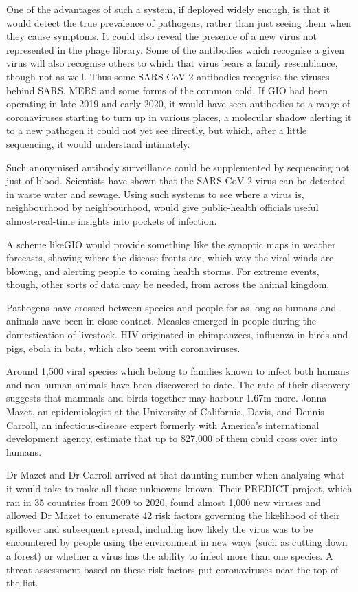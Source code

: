 \documentclass{article}
\begin{document}
One of the advantages of such a system, if deployed widely enough, is that it would detect the true prevalence of pathogens, rather than just seeing them when they cause symptoms. It could also reveal the presence of a new virus not represented in the phage library. Some of the antibodies which recognise a given virus will also recognise others to which that virus bears a family resemblance, though not as well. Thus some SARS-CoV-2 antibodies recognise the viruses behind SARS, MERS and some forms of the common cold. If GIO had been operating in late 2019 and early 2020, it would have seen antibodies to a range of coronaviruses starting to turn up in various places, a molecular shadow alerting it to a new pathogen it could not yet see directly, but which, after a little sequencing, it would understand intimately. 

Such anonymised antibody surveillance could be supplemented by sequencing not just of blood. Scientists have shown that the SARS-CoV-2 virus can be detected in waste water and sewage. Using such systems to see where a virus is, neighbourhood by neighbourhood, would give public-health officials useful almost-real-time insights into pockets of infection. 

A scheme likeGIO would provide something like the synoptic maps in weather forecasts, showing where the disease fronts are, which way the viral winds are blowing, and alerting people to coming health storms. For extreme events, though, other sorts of data may be needed, from across the animal kingdom. 

Pathogens have crossed between species and people for as long as humans and animals have been in close contact. Measles emerged in people during the domestication of livestock. HIV originated in chimpanzees, influenza in birds and pigs, ebola in bats, which also teem with coronaviruses. 

Around 1,500 viral species which belong to families known to infect both humans and non-human animals have been discovered to date. The rate of their discovery suggests that mammals and birds together may harbour 1.67m more. Jonna Mazet, an epidemiologist at the University of California, Davis, and Dennis Carroll, an infectious-disease expert formerly with America's international development agency, estimate that up to 827,000 of them could cross over into humans. 

Dr Mazet and Dr Carroll arrived at that daunting number when analysing what it would take to make all those unknowns known. Their PREDICT project, which ran in 35 countries from 2009 to 2020, found almost 1,000 new viruses and allowed Dr Mazet to enumerate 42 risk factors governing the likelihood of their spillover and subsequent spread, including how likely the virus was to be encountered by people using the environment in new ways (such as cutting down a forest) or whether a virus has the ability to infect more than one species. A threat assessment based on these risk factors put coronaviruses near the top of the list. 
\end{document}
